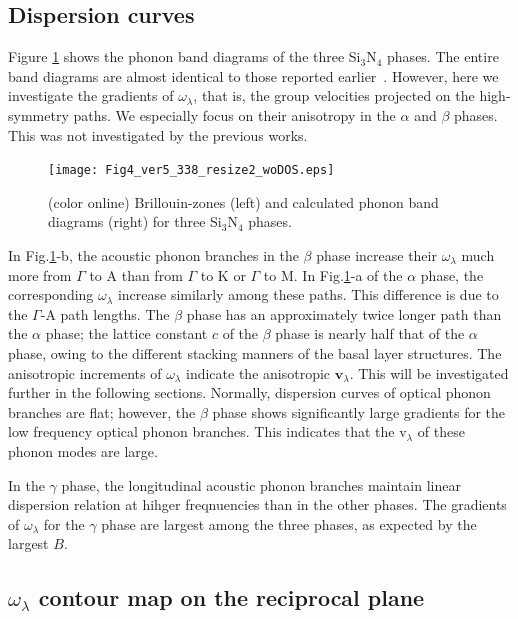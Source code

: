 \documentclass[twocolumn,amsmath,amssymb,a4paper,prb,superscriptaddress,floatfix]{revtex4-1}
\begin{document}
\subsection{Dispersion curves}

Figure \ref{fig:Fig4_ver5_338} shows the phonon band diagrams of the three
Si$_3$N$_4$ phases. The entire band diagrams are almost identical to those
reported earlier~\cite{kuwabara,xu}. However, here we investigate the gradients
of $\omega_\lambda$, that is, the group velocities projected on the
high-symmetry paths. We especially focus on their anisotropy in the $\alpha$ and
$\beta$ phases. This was not investigated by the previous works.

\begin{figure}[ht]
	 \begin{center}
		   \texttt{[image: Fig4\_ver5\_338\_resize2\_woDOS.eps]}
		     \caption{(color online) Brillouin-zones (left) and calculated phonon band diagrams (right) for three Si$_3$N$_4$ phases.
		   \label{fig:Fig4_ver5_338} }
    \end{center}
\end{figure}

In Fig.\ref{fig:Fig4_ver5_338}-b, the acoustic phonon branches in the $\beta$
phase increase their $\omega_\lambda$ much more from $\Gamma$ to A than from
$\Gamma$ to K or $\Gamma$ to M. In Fig.\ref{fig:Fig4_ver5_338}-a of the
$\alpha$ phase, the corresponding $\omega_\lambda$ increase similarly among
these paths.  This difference is due to the $\Gamma$-A path lengths.  The
$\beta$ phase has an approximately twice longer path than the $\alpha$ phase;
the lattice constant $c$ of the $\beta$ phase is nearly half that of the
$\alpha$ phase, owing to the different stacking manners of the basal layer
structures.  The anisotropic increments of $\omega_\lambda$ indicate the
anisotropic $\mathbf{v}_\lambda$.  This will be investigated further in the
following sections.  Normally, dispersion curves of optical phonon branches are
flat; however, the $\beta$ phase shows significantly large gradients for the
low frequency optical phonon branches.  This indicates that the
\rm{v}$_{\lambda}$ of these phonon modes are large.

In the $\gamma$ phase, the longitudinal acoustic phonon branches maintain
linear dispersion relation at hihger freqnuencies than in the other phases.
The gradients of $\omega_\lambda$ for the $\gamma$ phase are largest among the
three phases, as expected by the largest $B$.

\subsection{$\omega_\lambda$ contour map on the reciprocal plane}
\end{document}
